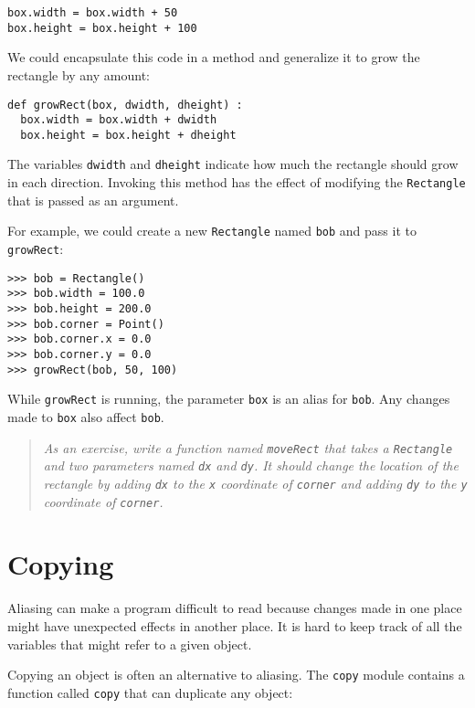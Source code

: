 \beforeverb
\begin{verbatim}
box.width = box.width + 50
box.height = box.height + 100
\end{verbatim}
\afterverb
%
We could encapsulate this code in a method and
generalize it to grow the rectangle by any amount:


\beforeverb
\begin{verbatim}
def growRect(box, dwidth, dheight) :
  box.width = box.width + dwidth
  box.height = box.height + dheight
\end{verbatim}
\afterverb
%
The variables {\tt dwidth} and {\tt dheight} indicate how much the
rectangle should grow in each direction.  Invoking this method has the
effect of modifying the {\tt Rectangle} that is passed as an argument.

For example, we could create a new {\tt Rectangle} named {\tt bob}
and pass it to {\tt growRect}:

\beforeverb
\begin{verbatim}
>>> bob = Rectangle()
>>> bob.width = 100.0
>>> bob.height = 200.0
>>> bob.corner = Point()
>>> bob.corner.x = 0.0
>>> bob.corner.y = 0.0
>>> growRect(bob, 50, 100)
\end{verbatim}
\afterverb
%
While {\tt growRect} is running, the parameter {\tt box} is an
alias for {\tt bob}.  Any changes made to {\tt box} also
affect {\tt bob}.

\begin{quote}
{\em As an exercise, write a function named {\tt moveRect} that takes
a {\tt Rectangle} and two parameters named {\tt dx} and {\tt dy}.  It
should change the location of the rectangle by adding {\tt dx}
to the {\tt x} coordinate of {\tt corner} and adding {\tt dy}
to the {\tt y} coordinate of {\tt corner}.}
\end{quote}


\section{Copying}
\label{embedded}

Aliasing can make a program difficult to read because changes
made in one place might have unexpected effects in another place.
It is hard to keep track of all the variables that might refer
to a given object.

Copying an object is often an alternative to aliasing.
The {\tt copy} module contains a function called {\tt copy} that
can duplicate any object:

